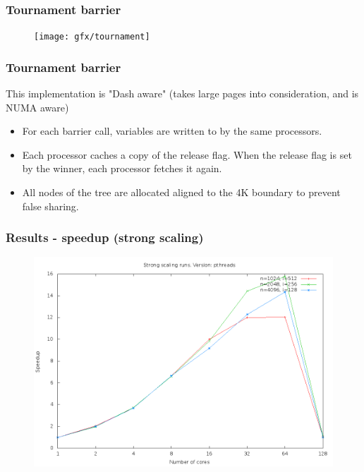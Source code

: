 \documentclass{beamer}
\begin{document}
\begin{frame}
\frametitle{Tournament barrier}
\begin{figure}
\texttt{[image: gfx/tournament]}
\end{figure}
\end{frame}

\begin{frame}
\frametitle{Tournament barrier}
This implementation is "Dash aware" (takes large pages into consideration, and is NUMA aware)
\begin{itemize}
\item For each barrier call, variables are written to by the same processors.
\pause
\item Each processor caches a copy of the release flag. When the release flag is set by the winner, each processor fetches it again.
\pause
\item All nodes of the tree are allocated aligned to the 4K boundary to prevent false sharing.
\end{itemize}
\end{frame}

\begin{frame}
\frametitle{Results - speedup (strong scaling)}
\begin{figure}
\includegraphics[width=\textwidth]{gfx/partitions_constant_width_tournament_barrier_strong_scaling_pthreads_speedup}
\end{figure}
\end{frame}
\end{document}
